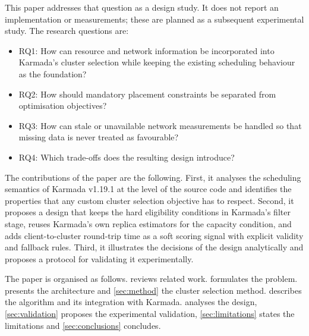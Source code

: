 This paper addresses that question as a design study. It does not report an implementation or measurements; these are planned as a subsequent experimental study. The research questions are:
\begin{itemize}
  \item RQ1: How can resource and network information be incorporated into Karmada's cluster selection while keeping the existing scheduling behaviour as the foundation?
  \item RQ2: How should mandatory placement constraints be separated from optimisation objectives?
  \item RQ3: How can stale or unavailable network measurements be handled so that missing data is never treated as favourable?
  \item RQ4: Which trade-offs does the resulting design introduce?
\end{itemize}

The contributions of the paper are the following. First, it analyses the scheduling semantics of Karmada v1.19.1 at the level of the source code and identifies the properties that any custom cluster selection objective has to respect. Second, it proposes a design that keeps the hard eligibility conditions in Karmada's filter stage, reuses Karmada's own replica estimators for the capacity condition, and adds client-to-cluster round-trip time as a soft scoring signal with explicit validity and fallback rules. Third, it illustrates the decisions of the design analytically and proposes a protocol for validating it experimentally.

The paper is organised as follows.  reviews related work.  formulates the problem.  presents the architecture and \cref{sec:method} the cluster selection method.  describes the algorithm and its integration with Karmada.  analyses the design, \cref{sec:validation} proposes the experimental validation, \cref{sec:limitations} states the limitations and \cref{sec:conclusions} concludes.
